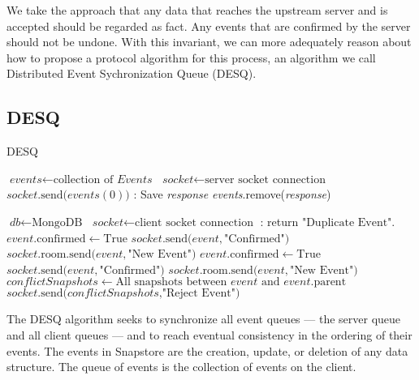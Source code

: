 We take the approach that any data that reaches the upstream server and is accepted should be regarded as fact. Any events that are confirmed by the server should not be undone. With this invariant, we can more adequately reason about how to propose a protocol algorithm for this process, an algorithm we call Distributed Event Sychronization Queue (DESQ).

\subsection{DESQ} 

\makeatletter
\def\BState{\State\hskip-\ALG@thistlm}
\makeatother

\begin{algorithm}
\caption{DESQ}\label{euclid}
\begin{algorithmic}[1]
\State $\textit{events} \gets \text{collection of }\textit{Events}$
\State $\textit{socket} \gets \text{server socket connection}$
\State $socket\text{.send(}events(0)\text{)}$
\EndWhile
{}:
\State Save \emph{response}
\State \emph{events}.remove(\emph{response})
\EndIf
\EndLoop
\EndProcedure
\end{algorithmic}
\begin{algorithmic}[1]
\State $\textit{db} \gets \text{MongoDB}$
\State $\textit{socket} \gets \text{client socket connection}$
:
\State return $\text{"Duplicate Event"}$.
\EndIf
{}
\State $event\text{.confirmed} \gets \text{True}$
\State $socket\text{.send(}event, \text{"Confirmed")}$
\State $socket\text{.room.send(}event, \text{"New Event")}$
\Else
{}
\State $event\text{.confirmed} \gets \text{True}$
\State $socket\text{.send(}event, \text{"Confirmed")}$
\State $socket\text{.room.send(}event, \text{"New Event")}$
\Else
\State $conflictSnapshots \gets \text{All snapshots between }event\text{ and }event\text{.parent}$
\State $socket\text{.send(}conflictSnapshots\text{,"Reject Event")}$
\EndIf
\EndIf
\EndLoop
\EndProcedure
\end{algorithmic}
\end{algorithm}

The DESQ algorithm seeks to synchronize all event queues --- the server queue and all client queues --- and to reach eventual consistency in the ordering of their events. The events in Snapstore are the creation, update, or deletion of any data structure. The queue of events is the collection of events on the client.


